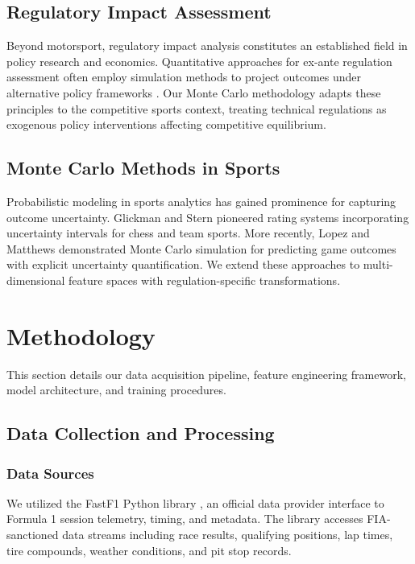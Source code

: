 \documentclass[conference]{IEEEtran}
\begin{document}
\subsection{Regulatory Impact Assessment}

Beyond motorsport, regulatory impact analysis constitutes an established field in policy research and economics. Quantitative approaches for ex-ante regulation assessment often employ simulation methods to project outcomes under alternative policy frameworks \cite{kirkpatrick2006}. Our Monte Carlo methodology adapts these principles to the competitive sports context, treating technical regulations as exogenous policy interventions affecting competitive equilibrium.

\subsection{Monte Carlo Methods in Sports}

Probabilistic modeling in sports analytics has gained prominence for capturing outcome uncertainty. Glickman and Stern \cite{glickman1998} pioneered rating systems incorporating uncertainty intervals for chess and team sports. More recently, Lopez and Matthews \cite{lopez2015} demonstrated Monte Carlo simulation for predicting game outcomes with explicit uncertainty quantification. We extend these approaches to multi-dimensional feature spaces with regulation-specific transformations.

\section{Methodology}

This section details our data acquisition pipeline, feature engineering framework, model architecture, and training procedures.

\subsection{Data Collection and Processing}

\subsubsection{Data Sources}

We utilized the FastF1 Python library \cite{fastf1}, an official data provider interface to Formula 1 session telemetry, timing, and metadata. The library accesses FIA-sanctioned data streams including race results, qualifying positions, lap times, tire compounds, weather conditions, and pit stop records.
\end{document}
